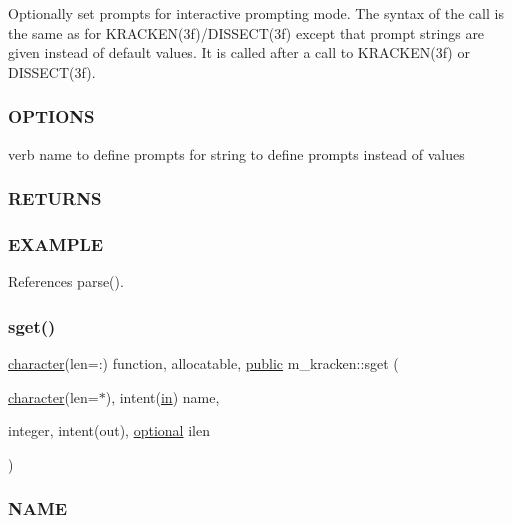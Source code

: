 \begin{DoxyVerb}Optionally set prompts for interactive prompting mode.
The syntax of the call is the same as for KRACKEN(3f)/DISSECT(3f) except that prompt
strings are given instead of default values. It is called after a call to KRACKEN(3f)
or DISSECT(3f).
\end{DoxyVerb}


\subsubsection*{O\+P\+T\+I\+O\+NS}

verb name to define prompts for string to define prompts instead of values \subsubsection*{R\+E\+T\+U\+R\+NS}

\subsubsection*{E\+X\+A\+M\+P\+LE}

References parse().

\mbox{\label{namespacem__kracken_a9a64192326816b0b9badcc11506628ee}} 
\subsubsection{\texorpdfstring{sget()}{sget()}}
{\footnotesize\ttfamily \hyperlink{option__stopwatch_83_8txt_abd4b21fbbd175834027b5224bfe97e66}{character}(len=\+:) function, allocatable, \hyperlink{M__stopwatch_83_8txt_a2f74811300c361e53b430611a7d1769f}{public} m\+\_\+kracken\+::sget (\begin{DoxyParamCaption}\item[{\hyperlink{option__stopwatch_83_8txt_abd4b21fbbd175834027b5224bfe97e66}{character}(len=$\ast$), intent(\hyperlink{M__journal_83_8txt_afce72651d1eed785a2132bee863b2f38}{in})}]{name,  }\item[{integer, intent(out), \hyperlink{option__stopwatch_83_8txt_aa4ece75e7acf58a4843f70fe18c3ade5}{optional}}]{ilen }\end{DoxyParamCaption})}



\subsubsection*{N\+A\+ME}

